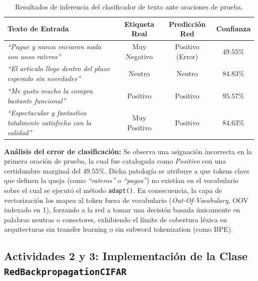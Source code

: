 \documentclass[12pt]{article}
\begin{document}
\begin{table}[H]
	\centering
	\caption{Resultados de inferencia del clasificador de texto ante oraciones de prueba.}
	\label{tab:nlp_results}
	\vspace{0.2cm}
	\begin{tabular}{|p{7.5cm}|c|c|c|}
		\hline
		\textbf{Texto de Entrada} & \textbf{Etiqueta Real} & \textbf{Predicción Red} & \textbf{Confianza} \\ \hline
		\textit{``Pague y nunca enviaron nada son unos rateros''} & Muy Negativo & Positivo (Error) & $49.55\%$ \\ \hline
		\textit{``El articulo llego dentro del plazo esperado sin novedades''} & Neutro & Neutro & $84.83\%$ \\ \hline
		\textit{``Me gusto mucho la compra bastante funcional''} & Positivo & Positivo & $95.57\%$ \\ \hline
		\textit{``Espectacular y fantastico totalmente satisfecho con la calidad''} & Muy Positivo & Positivo & $84.63\%$ \\ \hline
	\end{tabular}
\end{table}

\textbf{Análisis del error de clasificación:} Se observa una asignación incorrecta en la primera oración de prueba, la cual fue catalogada como \textit{Positivo} con una certidumbre marginal del $49.55\%$. Dicha patología se atribuye a que tokens clave que definen la queja (como \textit{``rateros''} o \textit{``pagos''}) no existían en el vocabulario sobre el cual se ejecutó el método \texttt{adapt()}. En consecuencia, la capa de vectorización los mapea al token fuera de vocabulario (\textit{Out-Of-Vocabulary}, OOV indexado en 1), forzando a la red a tomar una decisión basada únicamente en palabras neutras o conectores, exhibiendo el límite de cobertura léxica en arquitecturas sin transfer learning o sin subword tokenization (como BPE).

\subsection{Actividades 2 y 3: Implementación de la Clase \texttt{RedBackpropagationCIFAR}}
\end{document}
